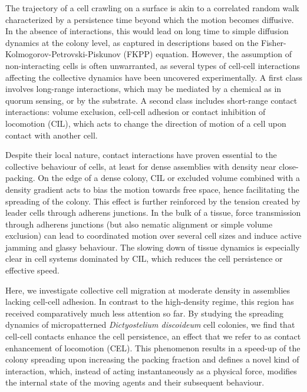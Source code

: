 \documentclass[11pt, twocolumn]{article}
\begin{document}
The trajectory of a cell crawling on a surface is akin to a correlated
random walk characterized by a persistence time beyond which the
motion becomes diffusive\cite{Selmeczi2008,Li2008}. In the absence of
interactions, this would lead on long time to simple diffusion
dynamics at the colony level, as captured in descriptions based on the Fisher-Kolmogorov-Petrovski-Piskunov (FKPP) equation\cite{FKPP,Simpson2013}. However, the assumption of
non-interacting cells is often
unwarranted\cite{Sengers2007,Marel2014}, as several types of cell-cell
interactions affecting the collective dynamics have been uncovered
experimentally. A first class involves long-range interactions, which
may be mediated by a chemical\cite{Gole2011,Phillips2012} as in quorum
sensing, or by the substrate\cite{Angelini2010}.  A second class
includes short-range contact interactions: volume exclusion, cell-cell
adhesion or contact inhibition of locomotion
(CIL)\cite{Abercrombie1953}, which acts to change the direction of
motion of a cell upon contact with another cell.

Despite their local nature, contact interactions have proven essential
to the collective behaviour of cells, at least for dense assemblies
with density near close-packing.  On the edge of a dense colony,
CIL\cite{Mayor2010} or excluded volume\cite{Dyson2014} combined with a
density gradient acts to bias the motion towards free
space\cite{Marel2014,Serra2012,Nnetu2012}, hence facilitating the
spreading of the colony\cite{Sengers2007,Dyson2014,Yates2015}. This
effect is further reinforced by the tension created by leader cells
through adherens junctions\cite{Serra2012,Sepulveda2013}. In the bulk
of a tissue, force transmission through adherens
junctions\cite{Petitjean2010,Tambe2011} (but also nematic
alignment\cite{Coburn2013,Duclos2014} or simple volume
exclusion\cite{Londono2014}) can lead to coordinated motion over
several cell sizes and induce active jamming and glassy
behaviour\cite{Angelini2011,Park2015,Garcia2015}. The slowing down of
tissue dynamics is especially clear in cell systems dominated by
CIL\cite{Mayor2010}, which reduces the cell
persistence\cite{Vedel2013} or effective speed\cite{Fily2012}.

Here, we investigate collective cell migration at moderate density in
assemblies lacking cell-cell adhesion. In contrast to the high-density
regime, this region has received comparatively much less attention so
far. By studying the spreading dynamics of micropatterned
\textit{Dictyostelium discoideum} cell colonies, we find that
cell-cell contacts enhance the cell persistence, an effect that we
refer to as contact enhancement of locomotion (CEL). This phenomenon
results in a speed-up of the colony spreading upon increasing the
packing fraction and defines a novel kind of interaction, which,
instead of acting instantaneously as a physical force, modifies the
internal state of the moving agents and their subsequent behaviour.
\end{document}
